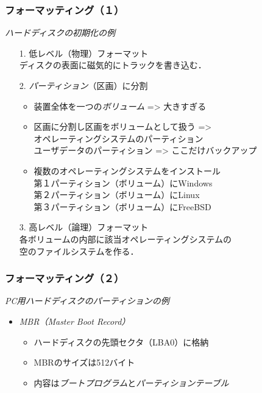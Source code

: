 \documentclass[unicode]{beamer}                   %
\begin{document}
\begin{frame}
  \frametitle{フォーマッティング（１）}
  \emph{ハードディスクの初期化の例}
  \begin{itemize}
    \item[1.] 低レベル（物理）フォーマット \\
      ディスクの表面に磁気的にトラックを書き込む．
    \item[2.] \emph{パーティション}（区画）に分割 \\
      \begin{itemize}
      \item 装置全体を一つの\emph{ボリューム} => 大きすぎる
      \item 区画に分割し区画をボリュームとして扱う => \\
        オペレーティングシステムのパーティション \\
        ユーザデータのパーティション => ここだけバックアップ
      \item 複数のオペレーティングシステムをインストール \\
        第１パーティション（ボリューム）にWindows \\
        第２パーティション（ボリューム）にLinux \\
        第３パーティション（ボリューム）にFreeBSD
      \end{itemize}
    \item[3.] 高レベル（論理）フォーマット \\
      各ボリュームの内部に該当オペレーティングシステムの \\
      空のファイルシステムを作る．
  \end{itemize}
\end{frame}

\begin{frame}
  \frametitle{フォーマッティング（２）}
  \emph{PC用ハードディスクのパーティションの例}
  \begin{itemize}
  \item \emph{MBR（Master Boot Record）} \\
    \begin{itemize}
    \item ハードディスクの先頭セクタ（LBA0）に格納
    \item MBRのサイズは512バイト
    \item 内容は\emph{ブートプログラム}と\emph{パーティションテーブル}
    \end{itemize}
  \end{itemize}
\end{frame}
\end{document}
